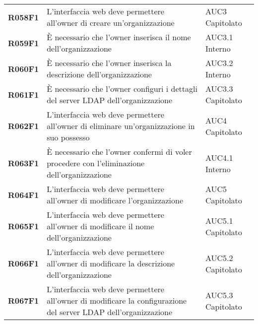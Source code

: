 \documentclass[../analisi-dei-requisiti.tex]{subfiles}
\begin{document}
\begin{longtable}[H]{>{\centering\bfseries}m{3cm} >{\centering}m{10cm} >{\centering\arraybackslash}m{3cm}}
  R058F1                               & L'interfaccia web deve permettere all'owner di creare un'organizzazione                                                                                                                                 & AUC3 Capitolato               \\
  R059F1                               & È necessario che l'owner inserisca il nome dell'organizzazione                                                                                                                                          & AUC3.1 Interno                \\
  R060F1                               & È necessario che l'owner inserisca la descrizione dell'organizzazione                                                                                                                                   & AUC3.2 Interno                \\
  R061F1                               & È necessario che l'owner configuri i dettagli del server LDAP dell'organizzazione                                                                                                                       & AUC3.3 Capitolato             \\
  R062F1                               & L'interfaccia web deve permettere all'owner di eliminare un'organizzazione in suo possesso                                                                                                              & AUC4 Capitolato               \\
  R063F1                               & È necessario che l'owner confermi di voler procedere con l'eliminazione dell'organizzazione                                                                                                             & AUC4.1 Interno                \\
  R064F1                               & L'interfaccia web deve permettere all'owner di modificare l'organizzazione                                                                                                                              & AUC5 Capitolato               \\
  R065F1                               & L'interfaccia web deve permettere all'owner di modificare il nome dell'organizzazione                                                                                                                   & AUC5.1 Capitolato             \\
  R066F1                               & L'interfaccia web deve permettere all'owner di modificare la descrizione dell'organizzazione                                                                                                            & AUC5.2 Capitolato             \\
  R067F1                               & L'interfaccia web deve permettere all'owner di modificare la configurazione del server LDAP dell'organizzazione                                                                                         & AUC5.3 Capitolato             \\


\end{longtable}
\end{document}
